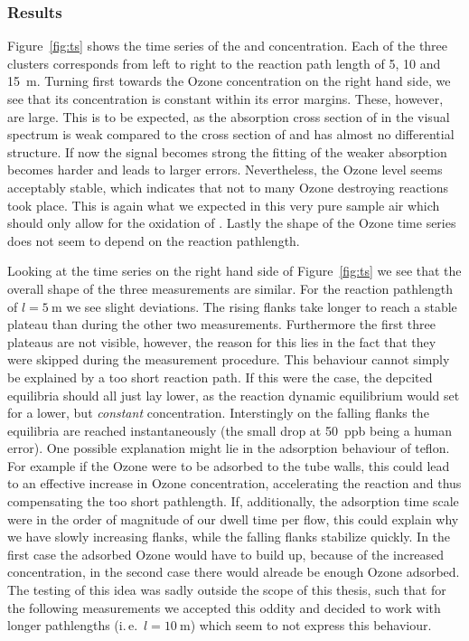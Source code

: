 \subsubsection{Results}
\label{sec:no-results}

Figure~\ref{fig:ts} shows the time series of the  and 
concentration. Each of the three clusters corresponds from left to
right to the reaction path length of \num{5}, \num{10} and
\SI{15}{\meter}. Turning first towards the Ozone concentration on the
right hand side, we see that its concentration is constant within its
error margins. These, however, are large. This is to be expected, as
the absorption cross section of  in the visual spectrum is weak
compared to the cross section of  and has almost no
differential structure. If now the  signal
becomes strong the fitting of the weaker  absorption becomes
harder and leads to larger errors. Nevertheless, the Ozone level seems
acceptably stable, which indicates that not to many Ozone destroying
reactions took place. This is again what we expected in this very pure
sample air which should only allow for the oxidation of
. Lastly the shape of the Ozone time series does not seem to
depend on the reaction pathlength.

Looking at the  time series on the right hand side of
Figure~\ref{fig:ts} we see that the overall shape of the three
measurements are similar. For the reaction pathlength of $l=
\SI{5}{\meter}$ we see slight deviations. The rising flanks take
longer to reach a stable plateau than during the other two
measurements. Furthermore the first three plateaus are not visible,
however, the reason for this lies in the fact that they were
skipped during the measurement procedure. This behaviour cannot simply
be explained by a too short reaction path. If this were the case, the
depcited equilibria should all just lay lower, as the reaction dynamic
equilibrium would set for a lower, but \emph{constant} 
concentration. Interstingly on the falling flanks the equilibria are
reached instantaneously (the small drop at \SI{50}{ppb} being a human
error). One possible explanation might lie in the adsorption behaviour
of teflon. For example if the Ozone were to be adsorbed to the tube
walls, this could lead to an effective increase in Ozone
concentration, accelerating the reaction and thus compensating the too
short pathlength. If, additionally, the adsorption time scale were in
the order of magnitude of our dwell time per flow, this could explain
why we have slowly increasing flanks, while the falling flanks
stabilize quickly. In the first case the adsorbed Ozone would have to
build up, because of the increased concentration, in the second case
there would alreade be enough Ozone adsorbed. The testing of this idea
was sadly outside the scope of this thesis, such that for the
following measurements we accepted this oddity and decided to work
with longer pathlengths (i.\,e.~$l = \SI{10}{\meter}$) which seem to
not express this behaviour.

